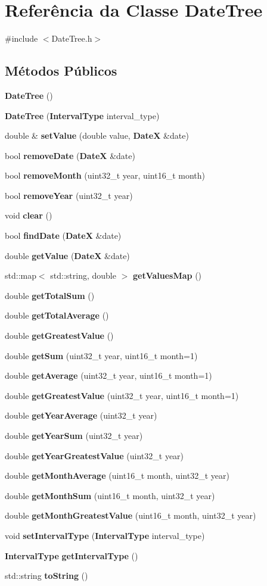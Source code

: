 \section{Referência da Classe Date\+Tree}
\label{class_date_tree}


{\ttfamily \#include $<$Date\+Tree.\+h$>$}

\subsection*{Métodos Públicos}
\begin{DoxyCompactItemize}
\item 
{\bf Date\+Tree} ()
\item 
{\bf Date\+Tree} ({\bf Interval\+Type} interval\+\_\+type)
\item 
double \& {\bf set\+Value} (double value, {\bf DateX} \&date)
\item 
bool {\bf remove\+Date} ({\bf DateX} \&date)
\item 
bool {\bf remove\+Month} (uint32\+\_\+t year, uint16\+\_\+t month)
\item 
bool {\bf remove\+Year} (uint32\+\_\+t year)
\item 
void {\bf clear} ()
\item 
bool {\bf find\+Date} ({\bf DateX} \&date)
\item 
double {\bf get\+Value} ({\bf DateX} \&date)
\item 
std\+::map$<$ std\+::string, double $>$ {\bf get\+Values\+Map} ()
\item 
double {\bf get\+Total\+Sum} ()
\item 
double {\bf get\+Total\+Average} ()
\item 
double {\bf get\+Greatest\+Value} ()
\item 
double {\bf get\+Sum} (uint32\+\_\+t year, uint16\+\_\+t month=1)
\item 
double {\bf get\+Average} (uint32\+\_\+t year, uint16\+\_\+t month=1)
\item 
double {\bf get\+Greatest\+Value} (uint32\+\_\+t year, uint16\+\_\+t month=1)
\item 
double {\bf get\+Year\+Average} (uint32\+\_\+t year)
\item 
double {\bf get\+Year\+Sum} (uint32\+\_\+t year)
\item 
double {\bf get\+Year\+Greatest\+Value} (uint32\+\_\+t year)
\item 
double {\bf get\+Month\+Average} (uint16\+\_\+t month, uint32\+\_\+t year)
\item 
double {\bf get\+Month\+Sum} (uint16\+\_\+t month, uint32\+\_\+t year)
\item 
double {\bf get\+Month\+Greatest\+Value} (uint16\+\_\+t month, uint32\+\_\+t year)
\item 
void {\bf set\+Interval\+Type} ({\bf Interval\+Type} interval\+\_\+type)
\item 
{\bf Interval\+Type} {\bf get\+Interval\+Type} ()
\item 
std\+::string {\bf to\+String} ()
\end{DoxyCompactItemize}


